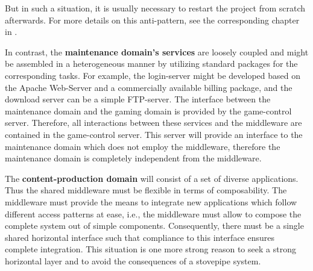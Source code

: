 \documentclass[a4paper, 10pt]{book}
\begin{document}
\begin{description}
                        But in such a situation, it is usually necessary to restart the
                        project from scratch afterwards.
                        For more details on this anti-pattern, see the corresponding chapter
                        in \cite{bmmm98}.
                    \item In contrast, the \textbf{maintenance domain's services} are
                        loosely coupled and might be assembled in a heterogeneous manner by
                        utilizing standard packages for the corresponding tasks. For
                        example, the login-server might be developed based on the Apache
                        Web-Server and a commercially available billing package, and the
                        download server can be a simple FTP-server.
                        The interface between the maintenance domain and the gaming domain
                        is provided by the game-control server. Therefore, all interactions
                        between these services and the middleware are contained in the
                        game-control server. This server will provide an interface to the
                        maintenance domain which does not employ the middleware, therefore
                        the maintenance domain is completely independent from the
                        middleware.
                    \item The \textbf{content-production domain} will consist of a set of
                        diverse applications. Thus the shared middleware must be flexible in
                        terms of composability.
                        The middleware must provide the means to integrate
                        new applications which follow different access patterns at ease,
                        i.e., the middleware must allow to compose the complete system out
                        of simple components.  Consequently, there must be a single shared
                        horizontal interface such that compliance to this interface ensures
                        complete integration.  This situation is one more strong reason to
                        seek a strong horizontal layer and to avoid the consequences of a
                        stovepipe system.
                \end{description}
\end{document}
